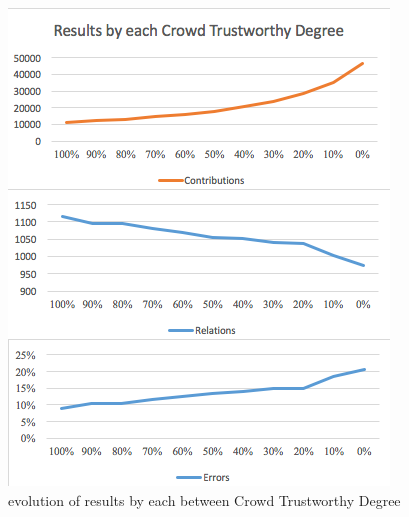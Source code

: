 \begin{figure}[h]
	\centerline{\includegraphics[scale=0.8] {figure/results-line}}
	\caption{evolution of results by each between Crowd Trustworthy Degree}
	\label{results-line}
\end{figure}
